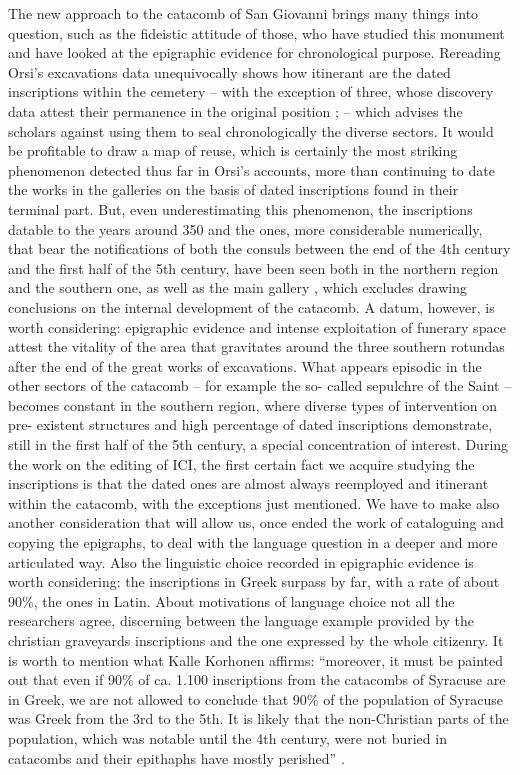 \documentclass[amsthm,ebook]{saparticle}
\begin{document}
The new approach to the catacomb of San Giovanni brings many things into question, such as the fideistic attitude of those, who have studied this monument and have looked at the epigraphic evidence for chronological purpose. Rereading Orsi’s excavations data unequivocally shows how itinerant are the dated inscriptions within the cemetery – with the exception of three, whose discovery data attest their permanence in the original position \citep[43-50, 352-353]{ORSI1896}; \citep[90, 97]{AGNELLO1953} – which advises the scholars against using them to seal chronologically the diverse sectors. It would be profitable to draw a map of reuse, which is certainly the most striking phenomenon detected thus far in Orsi’s accounts, more than continuing to date the works in the galleries on the basis of dated inscriptions found in their terminal part. But, even underestimating this phenomenon, the inscriptions datable to the years around 350 and the ones, more considerable numerically, that bear the notifications of both the consuls between the end of the 4th century and the first half of the 5th century, have been seen both in the northern region and the southern one, as well as the main gallery \citep[109, n. 62]{SGARLATA1996}, which excludes drawing conclusions on the internal development of the catacomb. A datum, however, is worth considering: epigraphic evidence and intense exploitation of funerary space attest the vitality of the area that gravitates around the three southern rotundas after the end of the great works of excavations. What appears episodic in the other sectors of the catacomb – for example the so- called sepulchre of the Saint – becomes constant in the southern region, where diverse types of intervention on pre- existent structures and high percentage of dated inscriptions demonstrate, still in the first half of the 5th century, a special concentration of interest. During the work on the editing of ICI, the first certain fact we acquire studying the inscriptions is that the dated ones are almost always reemployed and itinerant within the catacomb, with the exceptions just mentioned. We have to make also another consideration that will allow us, once ended the work of cataloguing and copying the epigraphs, to deal with the language question in a deeper and more articulated way. Also the linguistic choice recorded in epigraphic evidence is worth considering: the inscriptions in Greek surpass by far, with a rate of about 90\%, the ones in Latin. About motivations of language choice not all the researchers agree, discerning between the language example provided by the christian graveyards inscriptions and the one expressed by the whole citizenry. It is worth to mention what Kalle Korhonen affirms: ``moreover, it must be painted out that even if 90\% of ca. 1.100 inscriptions from the catacombs of Syracuse are in Greek, we are not allowed to conclude that 90\% of the population of Syracuse was Greek from the 3rd to the 5th. It is likely that the non-Christian parts of the population, which was notable until the 4th century, were not buried in catacombs and their epithaphs have mostly perished'' \citep[124- 125]{KORHONEN2011}.
\end{document}
